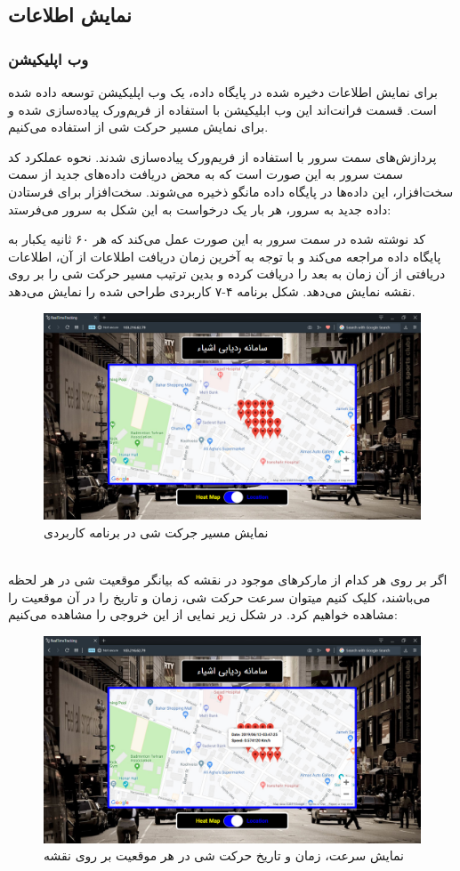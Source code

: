 \subsection{نمایش اطلاعات}
\subsubsection{وب اپلیکیشن}
برای نمایش اطلاعات دخیره شده در پایگاه داده، یک وب اپلیکیشن توسعه داده شده است. قسمت فرانت‌اند این وب ابلیکیشن با استفاده از فریم‌ورک  پیاده‌سازی شده و برای نمایش مسیر حرکت شی از  استفاده می‌کنیم.


پردازش‌های سمت سرور با استفاده از فریم‌ورک  پیاده‌سازی شدند. نحوه عملکرد کد سمت سرور به این صورت است که به محض دریافت داده‌های جدید از سمت سخت‌افزار، این داده‌ها در پایگاه داده مانگو ذخیره می‌شوند. سخت‌افزار برای فرستادن داده جدید به سرور، هر بار یک درخواست  به این شکل به سرور می‌فرستد: 


کد نوشته شده در سمت سرور به این صورت عمل می‌کند که هر ۶۰ ثانیه یکبار به پایگاه داده مراجعه می‌کند و با توجه به آخرین زمان دریافت اطلاعات از آن، اطلاعات دریافتی از  آن زمان به بعد را دریافت کرده و بدین ترتیب مسیر حرکت شی را بر روی نقشه نمایش می‌دهد.
\newpage
شکل برنامه ۴-۷ کاربردی طراحی شده را نمایش می‌دهد.
\\
 \begin{figure}[!h]
 	\centerline{\includegraphics[width=.9\textwidth]{webapp3}}
 	\caption{نمایش مسیر جرکت شی در برنامه کاربردی}
 \end{figure}
\\
 اگر بر روی هر کدام از مارکرهای موجود در نقشه که بیانگر موقعیت شی در هر لحظه می‌باشند، کلیک کنیم میتوان سرعت حرکت شی، زمان و تاریخ را در آن موقعیت را مشاهده خواهیم کرد. در شکل زیر نمایی از این خروجی را مشاهده می‌کنیم:
  \begin{figure}[!h]
 	\centerline{\includegraphics[width=.9\textwidth]{webapp4}}
 	\caption{نمایش سرعت، زمان و تاریخ حرکت شی در هر موقعیت بر روی نقشه}
 \end{figure}
